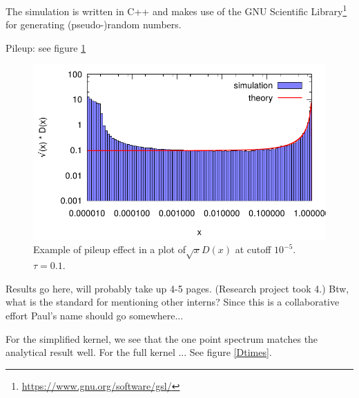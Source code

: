 \documentclass[a4paper,12pt]{article}
\numberwithin{equation}{section}
\begin{document}
The simulation is written in C++ and makes use of the GNU Scientific Library\footnote{\url{https://www.gnu.org/software/gsl/}} for generating (pseudo-)random numbers.




Pileup: see figure \ref{fig:D-5}

\begin{figure}
\centering
\includegraphics[width=0.7\linewidth]{Dpileup.pdf}
  \caption{Example of pileup effect in a plot of$\sqrt{x}D(x)$ at cutoff $10^{-5}$. $\tau=0.1$.}\label{fig:D-5}
\end{figure}



Results go here, will probably take up 4-5 pages. (Research project took 4.)
Btw, what is the standard for mentioning other interns? Since this is a collaborative effort Paul's name should go somewhere...





For the simplified kernel, we see that the one point spectrum matches the analytical result well. For the  full kernel ... See figure \ref{Dtimes}.
\end{document}
